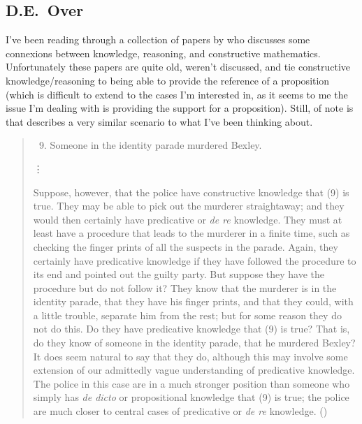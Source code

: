 \documentclass[10pt]{article}
\begin{document}
\subsection{D.E.\ Over}
\label{sec:d.e.-over}

I've been reading through a collection of papers by \citeauthor{Over:1983ab} who discusses some connexions between knowledge, reasoning, and constructive mathematics.
Unfortunately these papers are quite old, weren't discussed, and tie constructive knowledge/reasoning to being able to provide the reference of a proposition (which is difficult to extend to the cases I'm interested in, as it seems to me the issue I'm dealing with is providing the support for a proposition).
Still, of note is that \citeauthor{Over:1983ab} describes a very similar scenario to what I've been thinking about.

\begin{quote}
  \begin{enumerate}[label=(\arabic*)]
    \setcounter{enumi}{8}
  \item Someone in the identity parade murdered Bexley.
  \end{enumerate}

  \mbox{}\hfill\vdots\hfill\mbox{}

  Suppose, however, that the police have constructive knowledge that (9) is true.
  They may be able to pick out the murderer straightaway; and they would then certainly have predicative or \emph{de re} knowledge.
  They must at least have a procedure that leads to the murderer in a finite time, such as checking the finger prints of all the suspects in the parade.
  Again, they certainly have predicative knowledge if they have followed the procedure to its end and pointed out the guilty party.
  But suppose they have the procedure but do not follow it?
  They know that the murderer is in the identity parade, that they have his finger prints, and that they could, with a little trouble, separate him from the rest; but for some reason they do not do this.
  Do they have predicative knowledge that (9) is true?
  That is, do they know of someone in the identity parade, that he murdered Bexley?
  It does seem natural to say that they do, although this may involve some extension of our admittedly vague understanding of predicative knowledge.
  The police in this case are in a much stronger position than someone who simply has \emph{de dicto} or propositional knowledge that (9) is true; the police are much closer to central cases of predicative or \emph{de re} knowledge.\nolinebreak
  \mbox{}\hfill\mbox{(\citeyear[143--144]{Over:1983ab})}
\end{quote}
\end{document}
